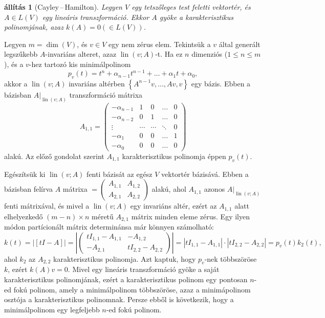 \documentclass[a4paper, showtrims]{memoir}
\makeatletter
\renewenvironment{proof}[1][\proofname]
    {\par\pushQED{\qed}%
    \normalfont \topsep6\p@\@plus6\p@\relax
    \trivlist
    \item[\hskip\labelsep
        \itshape
    #1\@addpunct{:}]\ignorespaces}
    {\popQED\endtrivlist\@endpefalse}
\theoremstyle{plain}
\newtheorem{proposition}{állítás}[chapter]
\theoremstyle{remark}
\theoremstyle{definition}
\DeclareMathOperator{\lin}{lin}
\makeatother
\begin{document}
\begin{proposition}[Cayley\,--\,Hamilton]
	Legyen $V$ egy tetszőleges test feletti vektortér,
	és $A\in L\left( V \right)$ egy lineáris transzformáció.
	Ekkor $A$ gyöke a karakterisztikus polinomjának,
	azaz $k\left( A \right)=0
		(\in L\left( V \right))$.
\end{proposition}
\begin{proof}
	Legyen $m=\dim(V)$, és $v\in V$ egy nem zérus elem.
	Tekintsük a $v$ által generált legszűkebb $A$-invariáns alteret, azaz
	$\lin\left( v;A \right)$-t.
	Ha ez $n$ dimenziós ($1\leq n\leq m$),
	és a $v$-hez tartozó kis minimálpolinom
	\[
		p_v\left( t \right)
		=
		t^{n}+\alpha_{n-1}t^{n-1}+\dots+\alpha_1t+\alpha_0,
	\]
	akkor a
	$\lin\left( v;A \right)$ invariáns altérben
	$\left\{ A^{n-1}v,\ldots,Av,v \right\}$ egy bázis.
	Ebben a bázisban $A|_{\lin\left( v;A \right)}$ transzformáció mátrixa
	\[
		A_{1,1}=
		\begin{pmatrix}
			-\alpha_{n-1} & 1      & 0      & \dots  & 0 \\
			-\alpha_{n-2} & 0      & 1      & \dots  & 0 \\
			\vdots        & \cdots & \cdots & \ddots & 0 \\
			-\alpha_1     & 0      & 0      & \dots  & 1 \\
			-\alpha_0     & 0      & 0      & \dots  & 0
		\end{pmatrix}
	\]
	alakú.
	Az előző gondolat szerint $A_{1,1}$ karakterisztikus polinomja éppen $p_v\left( t \right)$.

	Egészítsük ki $\lin\left( v;A \right)$ fenti bázisát az egész $V$ vektortér bázisává.
	Ebben a bázisban felírva $A$ mátrixa
	\begin{math}
		[A]=
		\begin{pmatrix}
			A_{1,1} & A_{1,2} \\
			A_{2,1} & A_{2,2}
		\end{pmatrix}
	\end{math}
	alakú, ahol $A_{1,1}$ azonos $A|_{\lin\left( v;A \right)}$ fenti mátrixával, és mivel a
	$\lin\left( v;A \right)$ egy invariáns altér,
	ezért az $A_{1,1}$ alatt elhelyezkedő $\left( m-n \right)\times n$ méretű $A_{2,1}$ mátrix minden eleme zérus.
	Egy ilyen módon partícionált mátrix determinánsa már könnyen számolható:
	\[
		k\left( t \right)=
		|[tI-A]|
		=
		\left|
		\begin{pmatrix}
			tI_{1,1}-A_{1,1} & -A_{1,2}         \\
			-A_{2,1}         & tI_{2,2}-A_{2,2}
		\end{pmatrix}
		\right|
		=
		|tI_{1,1}-A_{1,1}|\cdot|tI_{2,2}-A_{2,2}|
		=
		p_v\left( t \right)k_2\left( t \right),
	\]
	ahol $k_2$ az $A_{2,2}$ karakterisztikus polinomja.
	Azt kaptuk, hogy $p_v$-nek többszöröse $k$,
	ezért $k\left( A \right)v=0$.
\end{proof}
Mivel egy lineáris transzformáció gyöke a saját karakterisztikus polinomjának,
ezért a karakterisztikus polinom egy pontosan $n$-ed fokú polinom,
amely a minimálpolinom többszöröse,
azaz a minimápolinom osztója a karakterisztikus polinomnak.
Persze ebből is következik, hogy a minimálpolinom egy legfeljebb $n$-ed fokú polinom.
\end{document}
